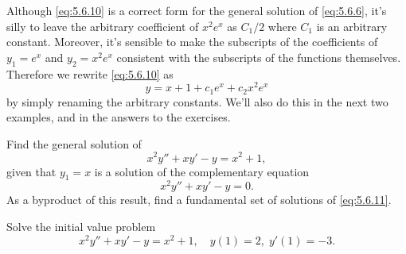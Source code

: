 Although \eqref{eq:5.6.10} is a correct form for the general solution of
\eqref{eq:5.6.6}, it's silly to leave the arbitrary coefficient of
$x^2e^x$ as $C_1/2$ where $C_1$ is an arbitrary constant. Moreover, it's
sensible to make the subscripts of the coefficients of $y_1=e^x$ and
$y_2=x^2e^x$ consistent with the subscripts of the functions
themselves. Therefore we rewrite \eqref{eq:5.6.10} as \[
y=x+1+c_1e^x+c_2x^2e^x \] by simply renaming the arbitrary constants.
We'll also do this in the next two examples, and in the answers to
the exercises.

\begin{example}\label{example:5.6.2}
\begin{alist}
\item %
Find the general solution of
\[
x^2y''+xy'-y=x^2+1,
\]
 given that $y_1=x$ is a solution of the complementary
equation
\begin{equation}  \label{eq:5.6.11}
x^2y''+xy'-y=0.
\end{equation}
  As a byproduct of this result, find a fundamental set of
solutions of \eqref{eq:5.6.11}.

\item %
Solve the initial value problem
\begin{equation}  \label{eq:5.6.12}
x^2y''+xy'-y=x^2+1, \quad   y(1)=2,\;  y'(1)=-3.
\end{equation}
\end{alist}
\end{example}

